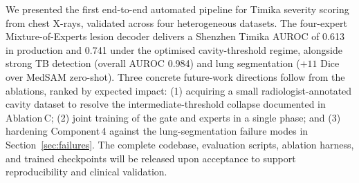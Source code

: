 \documentclass{article}
\begin{document}
We presented the first end-to-end automated pipeline for Timika severity scoring from chest X-rays, validated across four heterogeneous datasets. The four-expert Mixture-of-Experts lesion decoder delivers a Shenzhen Timika AUROC of 0.613 in production and 0.741 under the optimised cavity-threshold regime, alongside strong TB detection (overall AUROC 0.984) and lung segmentation ($+11$ Dice over MedSAM zero-shot). Three concrete future-work directions follow from the ablations, ranked by expected impact: (1) acquiring a small radiologist-annotated cavity dataset to resolve the intermediate-threshold collapse documented in Ablation\,C; (2) joint training of the gate and experts in a single phase; and (3) hardening Component\,4 against the lung-segmentation failure modes in Section~\ref{sec:failures}. The complete codebase, evaluation scripts, ablation harness, and trained checkpoints will be released upon acceptance to support reproducibility and clinical validation.

{\footnotesize


}
\end{document}
